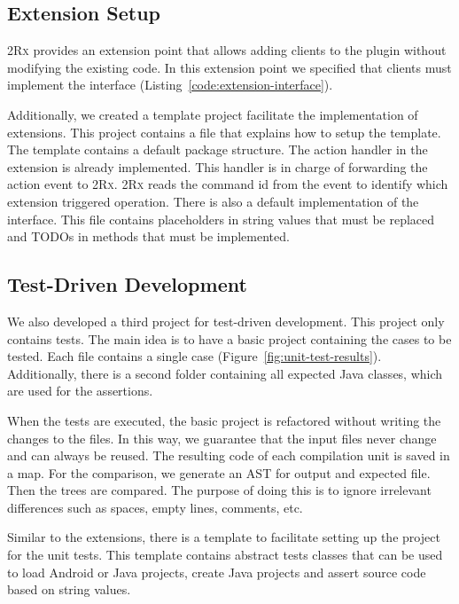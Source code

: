 \documentclass[type=bsc,accentcolor=tud9c]{tudthesis}
\newcommand{\framework}[1]{\textcolor{black!65}{#1}}
\newcommand{\toolcore}{\textsc{2Rx}}
\begin{document}
\subsection{Extension Setup}
\toolcore{} provides an extension point that allows adding clients to the plugin without modifying the existing code. In this extension point we specified that clients must implement the interface  (Listing~\ref{code:extension-interface}).



Additionally, we created a template project facilitate the implementation of extensions. This project contains a  file that explains how to setup the template. The template contains a default package structure. The action handler in the extension is already implemented. This handler is in charge of forwarding the action event to \toolcore{}. \toolcore{} reads the command id from the event to identify which extension triggered operation. There is also a default implementation of the  interface. This file contains placeholders in string values that must be replaced and TODOs in methods that must be implemented.

\subsection{Test-Driven Development}
We also developed a third project for test-driven development. This project only contains tests. The main idea is to have a basic project containing the cases to be tested. Each file contains a single case (Figure~\ref{fig:unit-test-results}). Additionally, there is a second folder containing all expected \framework{Java} classes, which are used for the assertions.

When the tests are executed, the basic project is refactored without writing the changes to the files. In this way, we guarantee that the input files never change and can always be reused. The resulting code of each compilation unit is saved in a map. For the comparison, we generate an AST for output and expected file. Then the trees are compared. The purpose of doing this is to ignore irrelevant differences such as spaces, empty lines, comments, etc.

Similar to the extensions, there is a template to facilitate setting up the project for the unit tests. This template contains abstract tests classes that can be used to load \framework{Android} or \framework{Java} projects, create \framework{Java} projects and assert source code based on string values.
\end{document}
